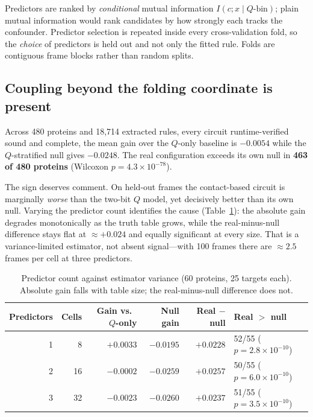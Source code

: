 Predictors are ranked by \emph{conditional} mutual information
$I(c; x \mid Q\text{-bin})$; plain mutual information would rank candidates by
how strongly each tracks the confounder.  Predictor selection is repeated
inside every cross-validation fold, so the \emph{choice} of predictors is held
out and not only the fitted rule.  Folds are contiguous frame blocks rather
than random splits.

\subsection{Coupling beyond the folding coordinate is present}

Across 480 proteins and 18{,}714 extracted rules, every circuit
runtime-verified sound and complete, the mean gain over the $Q$-only baseline
is $-0.0054$ while the $Q$-stratified null gives $-0.0248$.  The real
configuration exceeds its own null in \textbf{463 of 480 proteins}
(Wilcoxon $p = 4.3\times10^{-78}$).

The sign deserves comment.  On held-out frames the contact-based circuit is
marginally \emph{worse} than the two-bit $Q$ model, yet decisively better than
its own null.  Varying the predictor count identifies the cause
(Table~\ref{tab:cl-predcount}): the absolute gain degrades monotonically as the
truth table grows, while the real-minus-null difference stays flat at
$\approx +0.024$ and equally significant at every size.  That is a
variance-limited estimator, not absent signal---with 100 frames there are
$\approx 2.5$ frames per cell at three predictors.

\begin{table}[htbp]
\centering
\caption{Predictor count against estimator variance (60 proteins, 25 targets
each).  Absolute gain falls with table size; the real-minus-null difference
does not.}
\label{tab:cl-predcount}
\begin{tabular}{rrrrrl}
\toprule
Predictors & Cells & Gain vs.\ $Q$-only & Null gain & Real $-$ null & Real $>$ null \\
\midrule
1 & 8  & $+0.0033$ & $-0.0195$ & $+0.0228$ & 52/55 ($p = 2.8\times10^{-10}$) \\
2 & 16 & $-0.0002$ & $-0.0259$ & $+0.0257$ & 50/55 ($p = 6.0\times10^{-10}$) \\
3 & 32 & $-0.0023$ & $-0.0260$ & $+0.0237$ & 51/55 ($p = 3.5\times10^{-10}$) \\
\bottomrule
\end{tabular}
\end{table}

